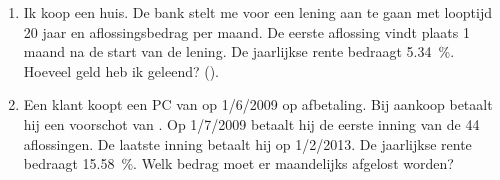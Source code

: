 \begin{enumerate}
   \item  Ik koop een huis. De bank stelt me voor een lening aan te gaan met looptijd 20 jaar en aflossingsbedrag  per maand. De eerste aflossing vindt plaats 1 maand na de start van de lening. De jaarlijkse rente bedraagt \SI{5,34}{\percent}. Hoeveel geld heb ik geleend? ().

\item Een klant koopt een PC van  op 1/6/2009 op afbetaling. Bij aankoop betaalt hij een voorschot van . Op 1/7/2009 betaalt hij de eerste inning van de 44 aflossingen. De laatste inning betaalt hij op 1/2/2013. De jaarlijkse rente bedraagt \SI{15,58}{\percent}. Welk bedrag moet er maandelijks afgelost worden?


\end{enumerate}


%
